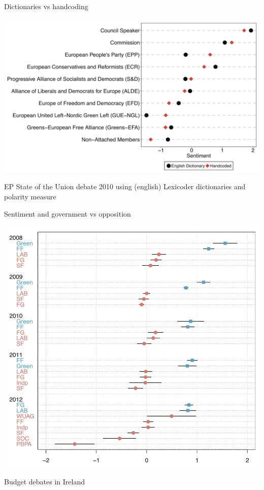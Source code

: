 \documentclass{hertieteaching}
\begin{document}
\begin{frame}{Dictionaries vs handcoding}

\centerline{\includegraphics[scale=0.5]{pictures/multilingual-sent-ep}}

EP State of the Union debate 2010 using (english) Lexicoder dictionaries and polarity measure \parencite{Proksch.etal2019}
\end{frame}

\begin{frame}{Sentiment and government vs opposition}

\centerline{\includegraphics[scale=0.4]{pictures/multilingual-sent-ie}}

Budget debates in Ireland \parencite{Proksch.etal2019}

\end{frame}
\end{document}
